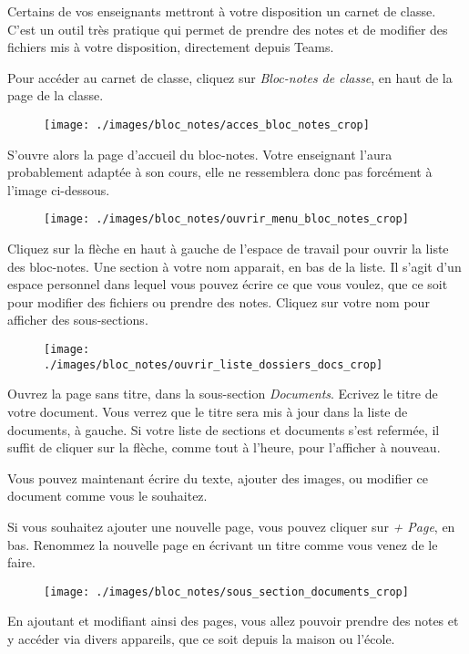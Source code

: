 Certains de vos enseignants mettront à votre disposition un carnet de classe. C'est un outil très pratique qui permet de prendre des notes et de modifier des fichiers mis à votre disposition, directement depuis Teams.

Pour accéder au carnet de classe, cliquez sur \textit{Bloc-notes de classe}, en haut de la page de la classe.

\begin{figure}[h]
	\texttt{[image: ./images/bloc\_notes/acces\_bloc\_notes\_crop]}
	\centering
\end{figure}

S'ouvre alors la page d'accueil du bloc-notes. Votre enseignant l'aura probablement adaptée à son cours, elle ne ressemblera donc pas forcément à l'image ci-dessous.

\begin{figure}[h]
	\texttt{[image: ./images/bloc\_notes/ouvrir\_menu\_bloc\_notes\_crop]}
	\centering
\end{figure}

Cliquez sur la flèche en haut à gauche de l'espace de travail pour ouvrir la liste des bloc-notes. Une section à votre nom apparait, en bas de la liste. Il s'agit d'un espace personnel dans lequel vous pouvez écrire ce que vous voulez, que ce soit pour modifier des fichiers ou prendre des notes. Cliquez sur votre nom pour afficher des sous-sections.

\begin{figure}[h]
	\texttt{[image: ./images/bloc\_notes/ouvrir\_liste\_dossiers\_docs\_crop]}
	\centering
\end{figure}

Ouvrez la page sans titre, dans la sous-section \textit{Documents}. Ecrivez le titre de votre document. Vous verrez que le titre sera mis à jour dans la liste de documents, à gauche. Si votre liste de sections et documents s'est refermée, il suffit de cliquer sur la flèche, comme tout à l'heure, pour l'afficher à nouveau.

Vous pouvez maintenant écrire du texte, ajouter des images, ou modifier ce document comme vous le souhaitez.

Si vous souhaitez ajouter une nouvelle page, vous pouvez cliquer sur \textit{+ Page}, en bas. Renommez la nouvelle page en écrivant un titre comme vous venez de le faire.

\begin{figure}[h]
	\texttt{[image: ./images/bloc\_notes/sous\_section\_documents\_crop]}
	\centering
\end{figure}

En ajoutant et modifiant ainsi des pages, vous allez pouvoir prendre des notes et y accéder via divers appareils, que ce soit depuis la maison ou l'école.